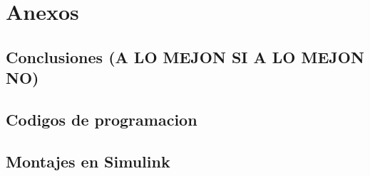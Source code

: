 \section{Anexos}
	\subsection{Conclusiones (A LO MEJON SI A LO MEJON NO)}
	\subsection{Codigos de programacion}
	\subsection{Montajes en Simulink}